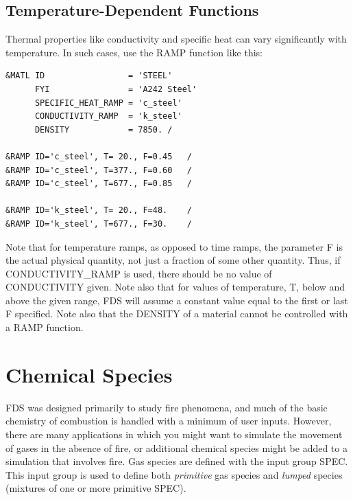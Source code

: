 \documentclass[11pt]{book}
\begin{document}
\section{Temperature-Dependent Functions}
\label{info:RAMP_Temperature}

Thermal properties like conductivity and specific heat can vary significantly with temperature. In such cases, use
the {\ct RAMP} function like this:
\begin{lstlisting}
&MATL ID                 = 'STEEL'
      FYI                = 'A242 Steel'
      SPECIFIC_HEAT_RAMP = 'c_steel'
      CONDUCTIVITY_RAMP  = 'k_steel'
      DENSITY            = 7850. /

&RAMP ID='c_steel', T= 20., F=0.45   /
&RAMP ID='c_steel', T=377., F=0.60   /
&RAMP ID='c_steel', T=677., F=0.85   /

&RAMP ID='k_steel', T= 20., F=48.    /
&RAMP ID='k_steel', T=677., F=30.    /
\end{lstlisting}
Note that for temperature ramps, as opposed to time ramps, the parameter {\ct F} is the actual physical quantity, not just
a fraction of some other quantity. Thus, if {\ct CONDUCTIVITY\_RAMP} is used, there should be no
value of {\ct CONDUCTIVITY} given. Note also that for values of temperature, {\ct T}, below and above the
given range, FDS will assume a constant value equal to the first or last {\ct F} specified. Note also that the {\ct DENSITY} of a material cannot be controlled with a {\ct RAMP} function.








\chapter{Chemical Species}
\label{info:SPEC}

FDS was designed primarily to study fire phenomena, and much of the basic chemistry of combustion is handled with a minimum of user inputs. However, there are many applications in which you might want to simulate the movement of gases in the absence of fire, or additional chemical species might be added to a simulation that involves fire.  Gas species are defined with the input group
{\ct SPEC}.  This input group is used to define both {\em primitive} gas species and {\em lumped} species (mixtures of one or more primitive {\ct SPEC}).
\end{document}
